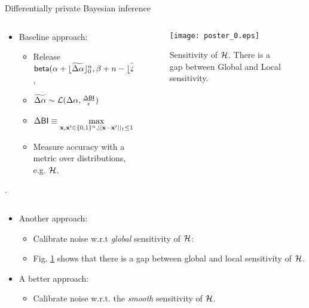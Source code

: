 \documentclass[final,hyperref={pdfpagelabels=false}]{beamer}
\begin{document}
\begin{frame}[t]
\begin{columns}[t]
\begin{column}{.485\textwidth}
\begin{block}{Differentially private Bayesian inference}
\begin{columns} %
  \begin{column}{.69\textwidth}
    \vspace{-3cm}
\begin{itemize}
\item  Baseline approach: 
  \begin{itemize}
  \item Release $\mathsf{beta}(\alpha +  \lfloor\widetilde{\Delta \alpha}\rfloor^n_0,\beta + n - \lfloor\widetilde{\Delta \alpha}\rfloor^n_0)$,
  \item $\widetilde{\Delta \alpha}\sim \mathcal{L}(\Delta\alpha, \frac{\Delta \mathsf{BI}}{\epsilon})$
  \item $\Delta \mathsf{BI} \equiv \max\limits_{\textbf{x}, \textbf{x}' \in \{0,1\}^{n}, ||\textbf{x} - \textbf{x}'||_1 \leq 1} ||\mathsf{BI}(\textbf{x}) - \mathsf{BI}(\textbf{x}')||_1$
  \item Measure accuracy with a metric over distributions, e.g. $\mathcal{H}$.
  \end{itemize}
  \end{itemize}
  {}.
\end{column}
\begin{column}{.28\textwidth}
\begin{figure}[ht]
\centering
\texttt{[image: poster\_0.eps]}
\caption{\footnotesize{Sensitivity of $\mathcal{H}$. There is a gap between Global and Local sensitivity.}}
\label{fig_sensitivity}
\end{figure}
\end{column}
\end{columns}
    \vspace{-1cm}
\begin{itemize}
\item Another approach:
  \begin{itemize}
    \item Calibrate  noise w.r.t \emph{global} sensitivity of $\mathcal{H}$: {\color{red}{but global sensitivity is still too big.}}
    \item Fig. \ref{fig_sensitivity} shows that there is a gap between global and local sensitivity of $\mathcal{H}$.
    \end{itemize}
  \item A better approach:
    \begin{itemize}
      \item \large{Calibrate noise w.r.t. the \emph{smooth} sensitivity of $\mathcal{H}$.}
    \end{itemize}
\end{itemize}


\end{block}
\end{column}
\end{columns}
\end{frame}
\end{document}
